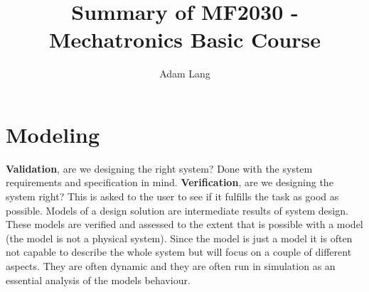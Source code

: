 \documentclass[12pt,a4paper]{article}
\title{Summary of MF2030 - Mechatronics Basic Course}
\author{Adam Lang}
\begin{document}
\maketitle
\section{Modeling}
\textbf{Validation}, are we designing the right system? Done with the
system requirements and specification in mind. \textbf{Verification}, are
we designing the system right? This is asked to the user to see if it
fulfills the task as good as possible. Models of a design solution are
intermediate results of system design. These models are verified and
assessed to the extent that is possible with a model (the model is not a
physical system). Since the model is just a model it is often not
capable to describe the whole system but will focus on a couple of
different aspects. They are often dynamic and they are often run in simulation
as an essential analysis of the models behaviour.
\end{document}
